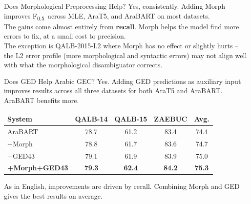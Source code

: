 \documentclass[aspectratio=169]{beamer}
\newcommand{\fhalf}{F\textsubscript{0.5}}
\begin{document}
\begin{frame}{Does Morphological Preprocessing Help?}
  Yes, consistently. Adding Morph improves \fhalf\ across MLE, AraT5,
  and AraBART on most datasets.\\[1em]

  The gains come almost entirely from \textbf{recall}.
  Morph helps the model find more errors to fix,
  at a small cost to precision.\\[1em]

  The exception is QALB-2015-L2 where Morph has no effect or slightly
  hurts -- the L2 error profile (more morphological and syntactic errors)
  may not align well with what the morphological disambiguator corrects.
\end{frame}

\begin{frame}{Does GED Help Arabic GEC?}
  Yes. Adding GED predictions as auxiliary input improves results
  across all three datasets for both AraT5 and AraBART.
  AraBART benefits more.\\[1em]

  \begin{center}
  \begin{tabular}{lcccc}
    \toprule
    \textbf{System} & \textbf{QALB-14} & \textbf{QALB-15} & \textbf{ZAEBUC} & \textbf{Avg.} \\
    \midrule
    AraBART & 78.7 & 61.2 & 83.4 & 74.4 \\
    +Morph & 78.8 & 61.7 & 83.6 & 74.7 \\
    +GED43 & 79.1 & 61.9 & 83.9 & 75.0 \\
    \textbf{+Morph+GED43} & \textbf{79.3} & \textbf{62.4} & \textbf{84.2} & \textbf{75.3} \\
    \bottomrule
  \end{tabular}
  \end{center}

  \vspace{0.5em}
  As in English, improvements are driven by recall.
  Combining Morph and GED gives the best results on average.
\end{frame}
\end{document}
